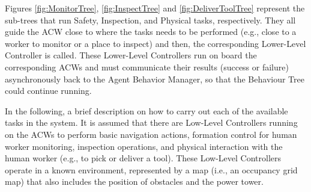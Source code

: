 
Figures \ref{fig:MonitorTree}, \ref{fig:InspectTree} and \ref{fig:DeliverToolTree} represent the sub-trees that run Safety, Inspection, and Physical tasks, respectively. They all guide the \gls{ACW} close to where the tasks needs to be performed (e.g., close to a worker to monitor or a place to inspect) and then, the corresponding Lower-Level Controller is called. These Lower-Level Controllers run on board the corresponding \gls{ACW}s and must communicate their results (success or failure) asynchronously back to the Agent Behavior Manager, so that the Behaviour Tree could continue running.

In the following, a brief description on how to carry out each of the available tasks in the system. It is assumed that there are Low-Level Controllers running on the \glspl{ACW} to perform basic navigation actions, formation control for human worker monitoring, inspection operations, and physical interaction with the human worker (e.g., to pick or deliver a tool). These Low-Level Controllers operate in a known environment, represented by a map (i.e., an occupancy grid map) that also includes the position of obstacles and the power tower.





